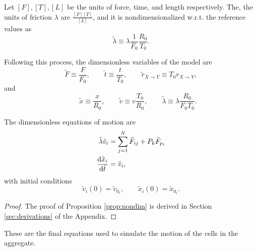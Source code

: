 \begin{example}
    Let $[F],{[T]},{[L]}$ be the units of force, time, and length respectively. The, the units of friction $\lambda$ are $\frac{[F][T]}{[L]}$, and it is nondimensionalized w.r.t. the reference values as
    $$\tilde \lambda\equiv \lambda\frac{1}{F_0}\frac{R_0}{T_0}.$$
\end{example}

Following this process, the dimensionless variables of the model are
\begin{equation}
    \tilde F \equiv \frac{F}{F_0},
    \qquad \tilde t \equiv \frac{t}{T_0},
    \qquad \tilde r_{X\rightarrow Y} \equiv {T_0}r_{X\rightarrow Y},
\end{equation}
and
\begin{equation}
    \qquad \tilde x \equiv \frac{x}{R_0},
    \qquad \tilde v \equiv v\frac{T_0}{R_0},
    \qquad \tilde \lambda\equiv \lambda\frac{R_0}{F_0T_0}.
\end{equation}

\begin{proposition}\label{prop:nondim}
    The dimensionless equations of motion are
    \begin{align}
        \begin{aligned}\label{eq:motion}
            \tilde \lambda \tilde v_i &=\sum_{j=1}^{N}\tilde F_{ij} + P_k \tilde F_{p_i}\\
            \frac{\mathrm{d} \tilde x_i}{\mathrm{d}\tilde t} &=\tilde v_i,
        \end{aligned}
    \end{align}
    with initial conditions
    \begin{equation}\label{eq:motion-ic}
        \tilde v_i(0) = \tilde v_{0_i}, \qquad \tilde x_i(0) = \tilde x_{0_i}.
    \end{equation}
\end{proposition}

\begin{proof}
    The proof of Proposition \ref{prop:nondim} is derived in Section \ref{sec:derivations} of the Appendix.
\end{proof}

These are the final equations used to simulate the motion of the cells in the aggregate.
